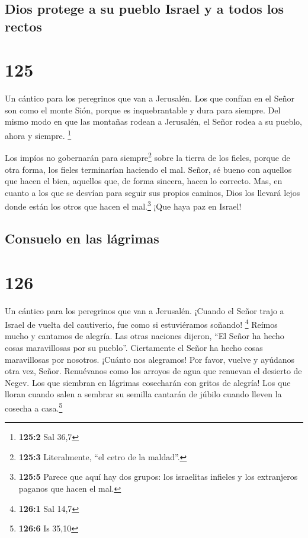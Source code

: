 \hypertarget{dios-protege-a-su-pueblo-israel-y-a-todos-los-rectos}{%
\subsection{Dios protege a su pueblo Israel y a todos los
rectos}\label{dios-protege-a-su-pueblo-israel-y-a-todos-los-rectos}}

\hypertarget{section-124}{%
\section{125}\label{section-124}}

Un cántico para los peregrinos que van a Jerusalén.  Los
que confían en el Señor son como el monte Sión, porque es inquebrantable
y dura para siempre.  Del mismo modo en que las montañas
rodean a Jerusalén, el Señor rodea a su pueblo, ahora y siempre.
\footnote{\textbf{125:2} Sal 36,7}

 Los impíos no gobernarán para siempre\footnote{\textbf{125:3}
  Literalmente, ``el cetro de la maldad''.} sobre la tierra de los
fieles, porque de otra forma, los fieles terminarían haciendo el mal.
 Señor, sé bueno con aquellos que hacen el bien, aquellos
que, de forma sincera, hacen lo correcto.  Mas, en cuanto
a los que se desvían para seguir sus propios caminos, Dios los llevará
lejos donde están los otros que hacen el mal.\footnote{\textbf{125:5}
  Parece que aquí hay dos grupos: los israelitas infieles y los
  extranjeros paganos que hacen el mal.} ¡Que haya paz en Israel!

\hypertarget{consuelo-en-las-luxe1grimas}{%
\subsection{Consuelo en las
lágrimas}\label{consuelo-en-las-luxe1grimas}}

\hypertarget{section-125}{%
\section{126}\label{section-125}}

Un cántico para los peregrinos que van a Jerusalén. 
¡Cuando el Señor trajo a Israel de vuelta del cautiverio, fue como si
estuviéramos soñando! \footnote{\textbf{126:1} Sal 14,7} 
Reímos mucho y cantamos de alegría. Las otras naciones dijeron, ``El
Señor ha hecho cosas maravillosas por su pueblo''. 
Ciertamente el Señor ha hecho cosas maravillosas por nosotros. ¡Cuánto
nos alegramos!  Por favor, vuelve y ayúdanos otra vez,
Señor. Renuévanos como los arroyos de agua que renuevan el desierto de
Negev.  Los que siembran en lágrimas cosecharán con gritos
de alegría!  Los que lloran cuando salen a sembrar su
semilla cantarán de júbilo cuando lleven la cosecha a casa.\footnote{\textbf{126:6}
  Is 35,10}


